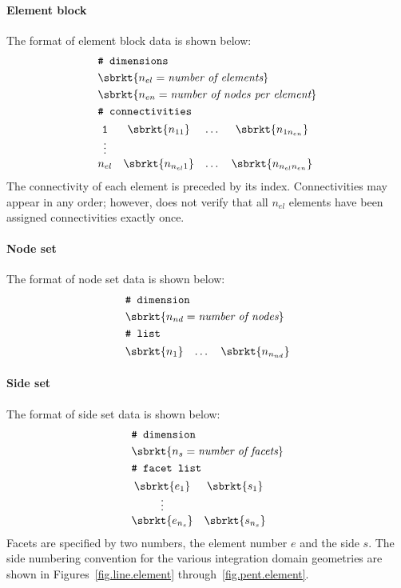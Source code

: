 \paragraph{Element block}
\label{sect.TahoeI.elements}
The format of element block data is shown below:
\begin{align}
& \texttt{\# dimensions} \notag \\
& \sbrkt{n_{el} = \textit{number of elements}} \notag \\
& \sbrkt{n_{en} = \textit{number of nodes per element}} \notag \\
& \texttt{\# connectivities} \notag \\
& \begin{matrix}
\texttt{1} & \sbrkt{n_{11}} & \dots  & \sbrkt{n_{1n_{en}}} \\
\vdots \\
n_{el} & \sbrkt{n_{n_{el}1}} & \dots & \sbrkt{n_{n_{el}n_{en}}}
\end{matrix} \notag
\end{align}
The connectivity of each element is preceded by its index. 
Connectivities may appear in any order; 
however, \tahoe does not verify that all $n_{el}$ 
elements have been assigned connectivities exactly once.

\paragraph{Node set}
\label{sect.TahoeI.nodeset}
The format of node set data is shown below:
\begin{align}
& \texttt{\# dimension} \notag \\
& \sbrkt{n_{nd} = \textit{number of nodes}} \notag \\
& \texttt{\# list} \notag \\
& \begin{matrix}
\sbrkt{n_{1}} & \dots  & \sbrkt{n_{n_{nd}}} \\
\end{matrix} \notag
\end{align}

\paragraph{Side set}
\label{sect.TahoeI.sideset}
The format of side set data is shown below:
\begin{align}
& \texttt{\# dimension} \notag \\
& \sbrkt{n_{s} = \textit{number of facets}} \notag \\
& \texttt{\# facet list} \notag \\
& \begin{matrix}
\sbrkt{e_{1}} & \sbrkt{s_{1}} \\
\vdots \\
\sbrkt{e_{n_{s}}} & \sbrkt{s_{n_{s}}}
\end{matrix} \notag
\end{align}
Facets are specified by two numbers, the element number $e$ and the
side $s$. The side numbering convention for the various integration 
domain geometries are shown in Figures~\ref{fig.line.element} 
through~\ref{fig.pent.element}.

